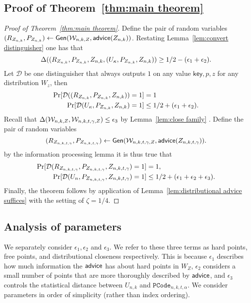 \subsection{Proof of Theorem~\ref{thm:main theorem}}
\label{ssec:proof main theorem}
\begin{proof}[Proof of Theorem~\ref{thm:main theorem}]
Define the pair of random variables $(R_{Z_{n,k}},P_{Z_{n,k}}) \leftarrow {\ensuremath{\mathsf{Gen}}}(\mathcal{W}_{n,k, Z}, {\mathsf{advice}}(Z_{n,k}))$.
Restating Lemma~\ref{lem:convert distinguisher} one has that 
\[
\Delta((R_{Z_{n,k}}, P_{Z_{n,k}}, Z_{n,k}, (U_\kappa, P_{Z_{n,k}}, Z_{n,k}))\ge 1/2-(\epsilon_1+\epsilon_2).
\]
Let $\mathcal{D}$ be one distinguisher that always outputs $1$ on any value $\mathsf{key}, p, z$ for any distribution $W_z$, then
\begin{align*}
\Pr[\mathcal{D}((R_{Z_{n,k}}, P_{Z_{n,k}}, Z_{n,k}))=1] &=1\\
\Pr[\mathcal{D}(U_\kappa, P_{Z_{n,k}}, Z_{n,k})=1]&\le 1/2+(\epsilon_1+\epsilon_2).
\end{align*}
Recall that $\Delta(\mathcal{W}_{n,k, Z}, \mathcal{W}_{n,k,t,\gamma, Z}) \le \epsilon_3$ by Lemma~\ref{lem:close family} .  Define the pair of random variables \[(R_{Z_{n,k,t,\gamma}}, P_{Z_{n,k,t,\gamma}})\leftarrow {\ensuremath{\mathsf{Gen}}}(\mathcal{W}_{n,k,t,\gamma, Z}, {\mathsf{advice}}(Z_{n,k,t,\gamma})).\]
by the information processing lemma it is thus true that 
\begin{align*}
\Pr[\mathcal{D}(R_{Z_{n,k,t,\gamma}}, P_{Z_{n,k,t,\gamma}}, Z_{n,k,t,\gamma})=1]&=1,\\
\Pr[\mathcal{D}(U_n, P_{Z_{n,k,t,\gamma}}, Z_{n,k,t,\gamma})=1]&\le 1/2+(\epsilon_1+\epsilon_2+\epsilon_3).
\end{align*}
Finally, the theorem follows by application of Lemma~\ref{lem:distributional advice suffices} with the setting of $\zeta = 1/4$.
\end{proof} 



\subsection{Analysis of parameters}
\label{ssec:analysis params}
We separately consider $\epsilon_1, \epsilon_2$ and $\epsilon_3$. We refer to these three terms as hard points, free points, and distributional closeness respectively. This is because $\epsilon_1$ describes how much information the ${\mathsf{advice}}$ has about hard points in $W_Z$, $\epsilon_2$ considers a small number of points that are more thoroughly described by ${\mathsf{advice}}$, and $\epsilon_3$ controls the statistical distance between $U_{n, k}$ and $\mathtt{PCode}_{n, k, t, \alpha}$.  We consider parameters in order of simplicity (rather than index ordering).



